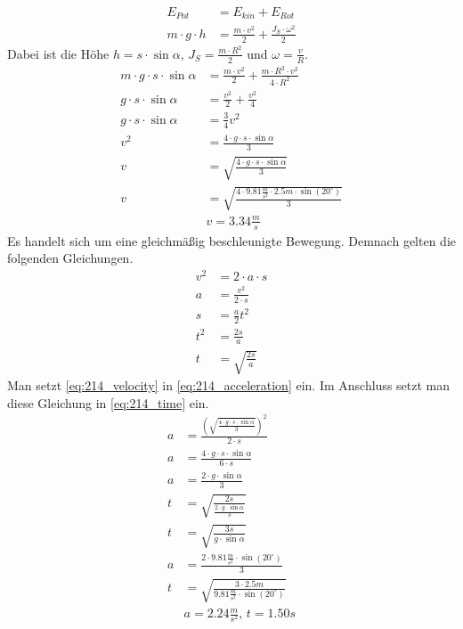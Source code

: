 \documentclass{article}
\begin{document}
	\begin{align*}
		E_{Pot}&=E_{kin}+E_{Rot}\\
		m\cdot g\cdot h&=\frac{m\cdot v^2}{2}+\frac{J_S\cdot\omega^2}{2}
	\end{align*}
	Dabei ist die Höhe $h=s\cdot\sin\alpha$, $J_S=\frac{m\cdot R^2}{2}$ und $\omega=\frac{v}{R}$.
	\begin{align}
		m\cdot g\cdot s\cdot\sin\alpha&=\frac{m\cdot v^2}{2}+\frac{m\cdot R^2\cdot v^2}{4\cdot R^2}		\nonumber\\
		g\cdot s\cdot\sin\alpha&=\frac{v^2}{2}+\frac{v^2}{4}																		\nonumber\\
		g\cdot s\cdot\sin\alpha&=\frac{3}{4}v^2																								\nonumber\\
		v^2&=\frac{4\cdot g\cdot s\cdot\sin\alpha}{3}																						\nonumber\\
		v&=\sqrt{\frac{4\cdot g\cdot s\cdot\sin\alpha}{3}}																				\label{eq:214_velocity}\\
		v&=\sqrt{\frac{4\cdot 9.81\frac{m}{s^2}\cdot 2.5m\cdot\sin(20^\circ)}{3}}										\nonumber\\
		&\boxed{v=3.34\frac{m}{s}}	\tag{a}	\label{eq:214_a}
	\end{align}
	Es handelt sich um eine gleichmäßig beschleunigte Bewegung. Demnach gelten die folgenden Gleichungen.
	\begin{align}
		v^2&=2\cdot a\cdot s	\nonumber\\
		a&=\frac{v^2}{2\cdot s}	\label{eq:214_acceleration}\\
		s&=\frac{a}{2}t^2		\nonumber\\
		t^2&=\frac{2s}{a}		\nonumber\\
		t&=\sqrt{\frac{2s}{a}}	\label{eq:214_time}
	\end{align}
	Man setzt \eqref{eq:214_velocity} in \eqref{eq:214_acceleration} ein. Im Anschluss setzt man diese Gleichung in \eqref{eq:214_time} ein.
	\begin{align*}
		a&=\frac{\left(\sqrt{\frac{4\cdot g\cdot s\cdot\sin\alpha}{3}}\right)^2}{2\cdot s}\\
		a&=\frac{4\cdot g\cdot s\cdot\sin\alpha}{6\cdot s}\\
		a&=\frac{2\cdot g\cdot\sin\alpha}{3}\\
		t&=\sqrt{\frac{2s}{\frac{2\cdot g\cdot\sin\alpha}{3}}}\\
		t&=\sqrt{\frac{3s}{g\cdot\sin\alpha}}\\
		a&=\frac{2\cdot 9.81\frac{m}{s^2}\cdot\sin(20^\circ)}{3}\\
		t&=\sqrt{\frac{3\cdot2.5m}{9.81\frac{m}{s^2}\cdot\sin(20^\circ)}}\\
		&\boxed{a=2.24\frac{m}{s^2},\,t=1.50s}	\tag{b}	\label{eq:214_b}
	\end{align*}
\end{document}
